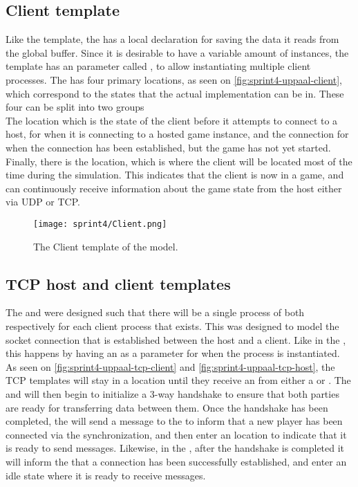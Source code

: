 \subsection{Client template}
Like the  template, the  has a local declaration for saving the data it reads from the global buffer.
Since it is desirable to have a variable amount of instances, the template has an  parameter called , to allow instantiating multiple client processes.
The  has four primary locations, as seen on \autoref{fig:sprint4-uppaal-client}, which correspond to the states that the actual implementation can be in.
These four can be split into two groups\\
The  location which is the state of the client before it attempts to connect to a host,  for when it is connecting to a hosted game instance, and the  connection for when the connection has been established, but the game has not yet started.
Finally, there is the  location, which is where the client will be located most of the time during the simulation. 
This indicates that the client is now in a game, and can continuously receive information about the game state from the host either via UDP or TCP.
\begin{figure}[h]
    \centering
    \texttt{[image: sprint4/Client.png]}
    \caption{The Client template of the \uppaal model.}
    \label{fig:sprint4-uppaal-client}
\end{figure}

\subsection{TCP host and client templates}
The  and  were designed such that there will be a single process of both respectively for each client process that exists.
This was designed to model the socket connection that is established between the host and a client.
Like in the , this happens by having an  as a parameter for when the process is instantiated.
As seen on \autoref{fig:sprint4-uppaal-tcp-client} and \autoref{fig:sprint4-uppaal-tcp-host}, the TCP templates will stay in a  location until they receive an  from either a  or .
The  and  will then begin to initialize a 3-way handshake to ensure that both parties are ready for transferring data between them.
Once the handshake has been completed, the  will send a message to the  to inform that a new player has been connected via the  synchronization, and then enter an  location to indicate that it is ready to send messages.
Likewise, in the , after the handshake is completed it will inform the  that a connection has been successfully established, and enter an idle state where it is ready to receive messages.

